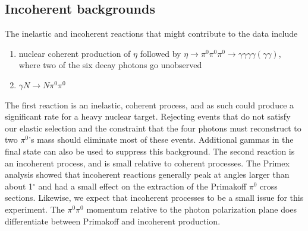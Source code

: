 \subsection{Incoherent backgrounds}
The inelastic and incoherent reactions that might contribute to the data include
\begin{enumerate}[label=(\roman*)]
    \item nuclear coherent production of $\eta$ followed by $\eta\rightarrow \pi^0\pi^0\pi^0 \rightarrow \gamma\gamma\gamma\gamma(\gamma\gamma)$, where two of the six decay photons go unobserved
    \item $\gamma N \rightarrow N \pi^0\pi^0$
\end{enumerate}
The first reaction is an inelastic, coherent process, and as such
could produce a significant rate for a heavy nuclear target. Rejecting 
events that do not satisfy our elastic selection and the constraint that the four photons must reconstruct to two $\pi^0$'s mass should eliminate most of these events. 
Additional gammas in the final state can also be used to suppress this
background.  
The second reaction is an incoherent process, and is
small relative to coherent processes.  The Primex analysis showed that
incoherent reactions generally peak at angles larger than about 1$^\circ$ and had a small effect on the extraction of the
Primakoff $\pi^0$ cross sections. Likewise, we expect that incoherent processes to be a small issue for this experiment. The $\pi^0\pi^0$ momentum relative to the photon polarization plane does differentiate between Primakoff and incoherent production.